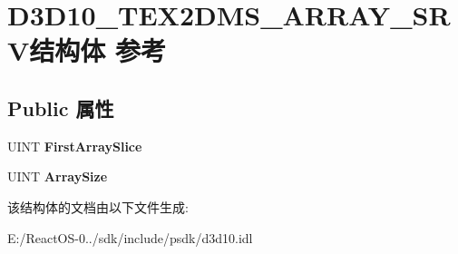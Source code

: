 \hypertarget{struct_d3_d10___t_e_x2_d_m_s___a_r_r_a_y___s_r_v}{}\section{D3\+D10\+\_\+\+T\+E\+X2\+D\+M\+S\+\_\+\+A\+R\+R\+A\+Y\+\_\+\+S\+R\+V结构体 参考}
\label{struct_d3_d10___t_e_x2_d_m_s___a_r_r_a_y___s_r_v}
\subsection*{Public 属性}
\begin{DoxyCompactItemize}
\item 
\mbox{\label{struct_d3_d10___t_e_x2_d_m_s___a_r_r_a_y___s_r_v_a6bc01c2ded00b4011ff0f82865c9ae98}} 
U\+I\+NT {\bfseries First\+Array\+Slice}
\item 
\mbox{\label{struct_d3_d10___t_e_x2_d_m_s___a_r_r_a_y___s_r_v_ad5d6fa79abf51eee67c564931a4b3586}} 
U\+I\+NT {\bfseries Array\+Size}
\end{DoxyCompactItemize}


该结构体的文档由以下文件生成\+:\begin{DoxyCompactItemize}
\item 
E\+:/\+React\+O\+S-\/0../sdk/include/psdk/d3d10.\+idl\end{DoxyCompactItemize}
